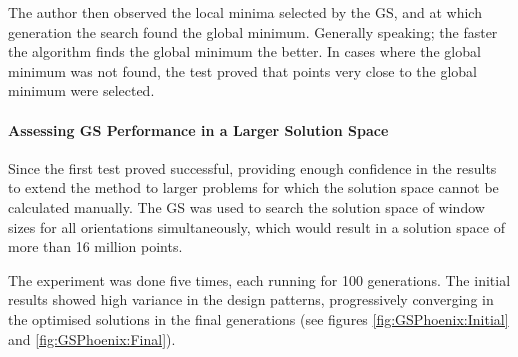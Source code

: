 The author then observed the local minima selected by the GS, and at which generation the search found the global minimum. Generally speaking; the faster the algorithm finds the global minimum the better. In cases where the global minimum was not found, the test proved that points very close to the global minimum were selected.

\paragraph{Assessing GS Performance in a Larger Solution Space}

Since the first test proved successful, providing enough confidence in the results to extend the method to larger problems for which the solution space cannot be calculated manually. The GS was used to search the solution space of window sizes for all orientations simultaneously, which would result in a solution space of more than 16 million points.

The experiment was done five times, each running for 100 generations. The initial results showed high variance in the design patterns, progressively converging in the optimised solutions in the final generations (see figures \ref{fig:GSPhoenix:Initial} and \ref{fig:GSPhoenix:Final}).
\label{sec:GAConvergence}

